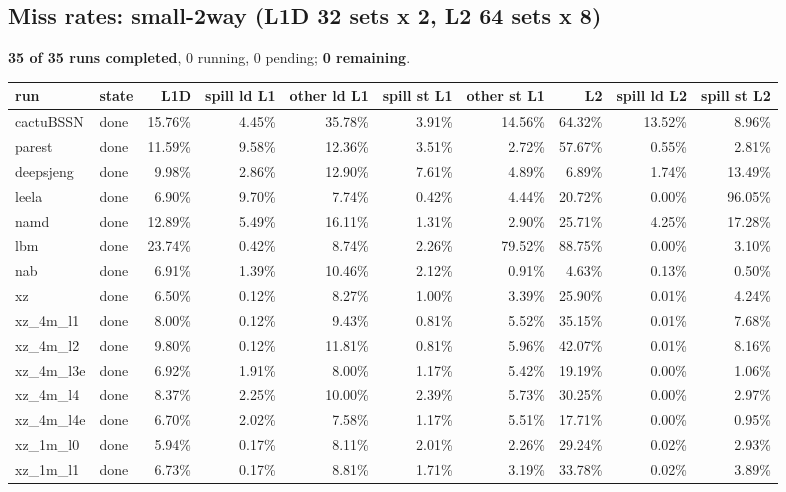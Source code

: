 \documentclass[10pt,a4paper,landscape]{article}
\begin{document}
\subsection*{Miss rates: small-2way (L1D 32 sets x 2, L2 64 sets x 8)}
\textbf{35 of 35 runs completed}, 0 running, 0 pending; \textbf{0 remaining}.\par
{\footnotesize
\begin{longtable}{llrrrrrrrr}
\toprule
run & state & L1D & spill ld L1 & other ld L1 & spill st L1 & other st L1 & L2 & spill ld L2 & spill st L2 \\
\midrule
\endhead
\bottomrule
\endfoot
cactuBSSN & done & 15.76\% & 4.45\% & 35.78\% & 3.91\% & 14.56\% & 64.32\% & 13.52\% & 8.96\% \\
parest & done & 11.59\% & 9.58\% & 12.36\% & 3.51\% & 2.72\% & 57.67\% & 0.55\% & 2.81\% \\
deepsjeng & done & 9.98\% & 2.86\% & 12.90\% & 7.61\% & 4.89\% & 6.89\% & 1.74\% & 13.49\% \\
leela & done & 6.90\% & 9.70\% & 7.74\% & 0.42\% & 4.44\% & 20.72\% & 0.00\% & 96.05\% \\
namd & done & 12.89\% & 5.49\% & 16.11\% & 1.31\% & 2.90\% & 25.71\% & 4.25\% & 17.28\% \\
lbm & done & 23.74\% & 0.42\% & 8.74\% & 2.26\% & 79.52\% & 88.75\% & 0.00\% & 3.10\% \\
nab & done & 6.91\% & 1.39\% & 10.46\% & 2.12\% & 0.91\% & 4.63\% & 0.13\% & 0.50\% \\
xz & done & 6.50\% & 0.12\% & 8.27\% & 1.00\% & 3.39\% & 25.90\% & 0.01\% & 4.24\% \\
xz\_4m\_l1 & done & 8.00\% & 0.12\% & 9.43\% & 0.81\% & 5.52\% & 35.15\% & 0.01\% & 7.68\% \\
xz\_4m\_l2 & done & 9.80\% & 0.12\% & 11.81\% & 0.81\% & 5.96\% & 42.07\% & 0.01\% & 8.16\% \\
xz\_4m\_l3e & done & 6.92\% & 1.91\% & 8.00\% & 1.17\% & 5.42\% & 19.19\% & 0.00\% & 1.06\% \\
xz\_4m\_l4 & done & 8.37\% & 2.25\% & 10.00\% & 2.39\% & 5.73\% & 30.25\% & 0.00\% & 2.97\% \\
xz\_4m\_l4e & done & 6.70\% & 2.02\% & 7.58\% & 1.17\% & 5.51\% & 17.71\% & 0.00\% & 0.95\% \\
xz\_1m\_l0 & done & 5.94\% & 0.17\% & 8.11\% & 2.01\% & 2.26\% & 29.24\% & 0.02\% & 2.93\% \\
xz\_1m\_l1 & done & 6.73\% & 0.17\% & 8.81\% & 1.71\% & 3.19\% & 33.78\% & 0.02\% & 3.89\% \\

\end{longtable}}
\end{document}
